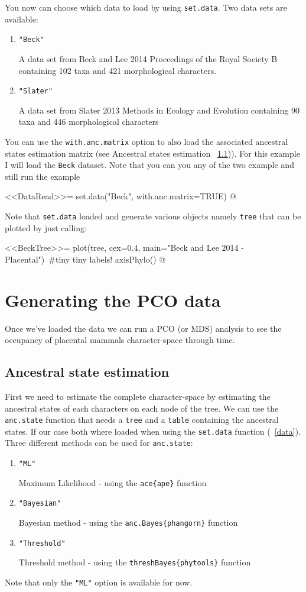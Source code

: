 \documentclass[a4paper,11pt]{article}
\begin{document}
You now can choose which data to load by using \texttt{set.data}. Two data sets are available:
\begin{enumerate}
\item{\texttt{"Beck"}}

A data set from Beck and Lee 2014 Proceedings of the Royal Society B containing 102 taxa and 421 morphological characters.

\item{\texttt{"Slater"}}

A data set from Slater 2013 Methods in Ecology and Evolution containing 90 taxa and 446 morphological characters
\end{enumerate}
You can use the \texttt{with.anc.matrix} option to also load the associated ancestral states estimation matrix (see Ancestral states estimation ~\ref{ACE})).
For this example I will load the \texttt{Beck} dataset. Note that you can you any of the two example and still run the example

<<DataRead>>=
set.data("Beck", with.anc.matrix=TRUE)
@

Note that \texttt{set.data} loaded and generate various objects namely \texttt{tree} that can be plotted by just calling:

<<BeckTree>>=
plot(tree, cex=0.4, main="Beck and Lee 2014 - Placental") #tiny tiny labels!
axisPhylo()
@

\section{Generating the PCO data}
Once we've loaded the data we can run a PCO (or MDS) analysis to see the occupancy of placental mammals character-space through time.

\subsection{Ancestral state estimation} \label{ACE}
First we need to estimate the complete character-space by estimating the ancestral states of each characters on each node of the tree.
We can use the \texttt{anc.state} function that needs a \texttt{tree} and a \texttt{table} containing the ancestral states.
If our case both where loaded when using the \texttt{set.data} function (~\ref{data}).
Three different methods can be used for \texttt{anc.state}:
\begin{enumerate}
\item{\texttt{"ML"}}

Maximum Likelihood - using the \texttt{ace\{ape\}} function
\item{\texttt{"Bayesian"}}

Bayesian method - using the \texttt{anc.Bayes\{phangorn\}} function

\item{\texttt{"Threshold"}}

Threshold method - using the \texttt{threshBayes\{phytools\}} function
\end{enumerate}
Note that only the \texttt{"ML"} option is available for now.
\end{document}
